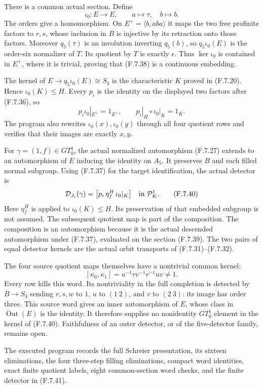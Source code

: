 There is a common actual section. Define
\[
 \iota_0:E\longrightarrow E,\qquad
                a\longmapsto\tau,\quad b\longmapsto b .
                                                               \tag{F.7.38}
\]
The orders give a homomorphism. On
$E^+=\langle b,aba\rangle$ it maps the two free
profinite factors to $r,s$, whose inclusion in
$B$ is injective by its retraction onto those factors.
Moreover $q_5(\tau)$ is an involution inverting
$q_5(b)$, so $q_5\iota_0(E)$ is the order-six
normalizer of $T$. Its quotient by $T$ is
exactly $\epsilon$. Thus $\ker\iota_0$ is contained
in $E^+$, where it is trivial, proving that
(F.7.38) is a continuous embedding.

The kernel of
$E\to q_5\iota_0(E)\cong S_3$ is the characteristic
$K$ proved in (F.7.20). Hence $\iota_0(K)\leq H$.
Every $p_i$ is the identity on the displayed two
factors after (F.7.36), so
\[
 p_i\iota_0|_{E^+}=1_{E^+},\qquad
             p_i|_H\circ\iota_0|_K=1_K.                 \tag{F.7.39}
\]
The program also rewrites $\iota_0(x),\iota_0(y)$
through all four quotient rows and verifies that
their images are exactly $x,y$.

For $\gamma=(1,f)\in GT_0^1$, the actual normalized
automorphism (F.7.27) extends to an automorphism of
$E$ inducing the identity on $A_5$. It preserves
$B$ and each filled normal subgroup.
Using (F.7.37) for the target identification, the
actual detector is
\[
 \mathcal D_{J_i}(\gamma)
        =\bigl[p_i\,\eta_f^H\,\iota_0|_K\bigr]
                          \quad\hbox{in }\mathcal P_K^1.
                                                               \tag{F.7.40}
\]
Here $\eta_f^H$ is applied to $\iota_0(K)\leq H$.
Its preservation of that embedded subgroup is
not assumed. The subsequent quotient map is
part of the composition. The composition is
an automorphism because it is the actual descended
automorphism under (F.7.37), evaluated on the
section (F.7.39).
The two pairs of equal detector kernels are
the actual orbit transports of (F.7.31)--(F.7.32).

The four source quotient maps themselves have
a nontrivial common kernel:
\[
 [\kappa_0,\kappa_1]
           =u^{-1}r v^{-1}r^{-1}uv\ne1.                 \tag{F.7.41}
\]
Every row kills this word.
Its nontriviality in the full completion is
detected by $B\to S_3$ sending $r,s,w$ to $1$,
$u$ to $(1\ 2)$, and $v$ to $(2\ 3)$:
its image has order three.
This source word gives an inner automorphism
of $E$, whose class in $\operatorname{Out}(E)$
is the identity. It therefore supplies no
nonidentity $GT_0^1$ element in the kernel of
(F.7.40). Faithfulness of an outer detector,
or of the five-detector family, remains open.

The executed program
records the full Schreier presentation, its
sixteen eliminations, the four three-step filling
eliminations, compact word identities, exact
finite quotient labels, eight common-section
word checks, and the finite detector in (F.7.41).
